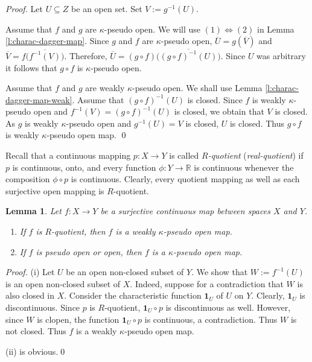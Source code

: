 \documentclass[preprint,11pt]{elsarticle}
\newtheorem{lemma}[theorem]{Lemma}
\numberwithin{equation}{section}
\numberwithin{theorem}{section}
\newcommand{\IR}{\mathbb{R}}
\newcommand{\LRa}{\Leftrightarrow}
\begin{document}
\begin{proof}
Let $U\subseteq Z$ be an open set. Set $V:=g^{-1}(U)$.

Assume that $f$ and $g$ are $\kappa$-pseudo open. We will use $(1)\LRa(2)$ in Lemma \ref{l:charac-dagger-map}. Since $g$ and $f$ are $\kappa$-pseudo open, $\overline{U}=g(\overline{V})$ and $\overline{V}=f\big(\overline{f^{-1}(V)}\big)$. Therefore, $\overline{U}=(g\circ f)\big(\overline{(g\circ f)^{-1}(U)}\big)$. Since $U$ was arbitrary it follows that $g\circ f$ is $\kappa$-pseudo open.

Assume that $f$ and $g$ are weakly $\kappa$-pseudo open. We shall use Lemma \ref{l:charac-dagger-map-weak}. Assume that $(g\circ f)^{-1}(U)$ is closed. Since $f$ is weakly $\kappa$-pseudo open and $f^{-1}(V)=(g\circ f)^{-1}(U)$ is closed, we obtain that $V$ is closed. As $g$ is weakly $\kappa$-pseudo open and $g^{-1}(U)=V$  is closed, $U$ is closed. Thus $g\circ f$ is weakly $\kappa$-pseudo open map. \qed
\end{proof}


Recall that a continuous mapping $p:X\to Y$ is called {\em $R$-quotient} ({\em real-quotient}) if $p$ is continuous, onto, and every function $\phi:Y\to\IR$ is continuous whenever the composition $\phi\circ p$ is continuous. Clearly, every quotient mapping as well as each surjective open mapping is $R$-quotient.

\begin{lemma} \label{l:exa-dagger-map}
Let $f:X\to Y$  be a surjective continuous map between spaces $X$ and $Y$.
\begin{enumerate}
\item[{\rm(i)}] If $f$ is $R$-quotient, then $f$ is a weakly $\kappa$-pseudo open  map.
\item[{\rm(ii)}] If $f$ is pseudo open or open, then $f$ is a  $\kappa$-pseudo open map.
\end{enumerate}
\end{lemma}

\begin{proof}
(i) Let $U$ be an open non-closed subset of $Y$. We show that $W:=f^{-1}(U)$ is an open non-closed subset of $X$. Indeed, suppose for a contradiction that $W$ is also closed in $X$. Consider the characteristic function $\mathbf{1}_U$ of $U$ on $Y$. Clearly, $\mathbf{1}_U$ is discontinuous. Since $p$ is $R$-quotient, $\mathbf{1}_U\circ p$ is discontinuous as well. However, since $W$ is clopen, the function $\mathbf{1}_U\circ p$ is continuous, a contradiction. Thus $W$ is not closed. Thus $f$ is a weakly  $\kappa$-pseudo open map.

(ii) is obvious.\qed
\end{proof}
\end{document}

